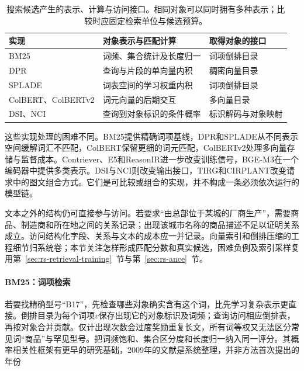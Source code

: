 \begin{table}[htbp]
 \centering
 \begin{tabularx}{\linewidth}{lXl}
  \toprule
  实现 & 对象表示与匹配计算 & 取得对象的接口 \\
  \midrule
  BM25 & 词频、集合统计及长度归一 & 词项倒排目录 \\
  DPR & 查询与片段的单向量内积 & 稠密向量目录 \\
  SPLADE & 词表空间的学习权重内积 & 词项倒排目录 \\
  ColBERT、ColBERTv2 & 词元向量的后期交互 & 多向量目录 \\
  DSI、NCI & 查询到对象标识的条件概率 & 标识解码与对象映射 \\
  \bottomrule
 \end{tabularx}
 \caption{搜索候选产生的表示、计算与访问接口。相同对象可以同时拥有多种表示；比较时应固定检索单位与候选预算。}
 \label{tab:rs-search-retrieval-interfaces}
\end{table}

这些实现处理的困难不同。BM25提供精确词项基线，DPR和SPLADE从不同表示空间缓解词汇不匹配，ColBERT保留更细的词元匹配，ColBERTv2处理多向量存储与监督成本。Contriever、E5和ReasonIR进一步改变训练信号，BGE-M3在一个编码器中提供多类表示。DSI与NCI则改变输出接口，TIRG和CIRPLANT改变请求中的图文组合方式。它们是可比较或组合的实现，并不构成一条必须依次运行的模型链。

文本之外的结构仍可直接参与访问。若要求“由总部位于某城的厂商生产”，需要商品、制造商和所在地之间的关系记录；出现该城市名称的商品描述不足以证明关系成立。访问结构化字段、关系与文本的成本应一并记录。向量索引和倒排压缩的工程细节归系统卷；本节关注怎样形成匹配分数和真实候选，困难负例及索引采样复用第~\ref{sec:rs-retrieval-training}~节与第~\ref{sec:rs-ance}~节。

\Needspace{100mm}
\paragraph{BM25：词项检索}
\label{sec:rs-search-bm25}

若要找精确型号“B17”，先检查哪些对象确实含有这个词，比先学习复杂表示更直接。倒排目录为每个词项$v$保存出现它的对象标识及词频；查询访问相应倒排表，再按对象合并贡献。仅计出现次数会过度奖励重复长文，所有词等权又无法区分常见词“商品”与罕见型号。把词频饱和、集合区分度和长度归一纳入同一评分。其概率相关性框架有更早的研究基础，2009年的文献是系统整理，并非方法首次提出的年份

